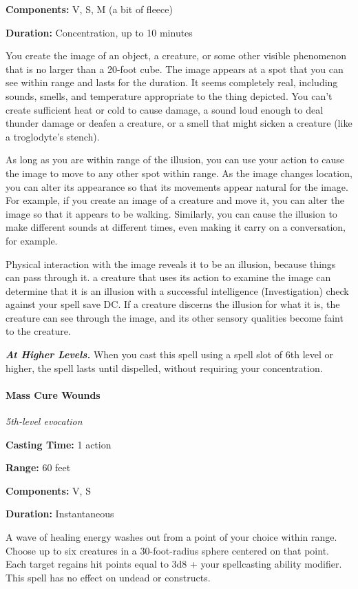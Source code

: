 \documentclass[
]{article}
\begin{document}
\textbf{Components:} V, S, M (a bit of fleece)

\textbf{Duration:} Concentration, up to 10 minutes

You create the image of an object, a creature, or some other visible
phenomenon that is no larger than a 20-foot cube. The image appears at a
spot that you can see within range and lasts for the duration. It seems
completely real, including sounds, smells, and temperature appropriate
to the thing depicted. You can't create sufficient heat or cold to cause
damage, a sound loud enough to deal thunder damage or deafen a creature,
or a smell that might sicken a creature (like a troglodyte's stench).

As long as you are within range of the illusion, you can use your action
to cause the image to move to any other spot within range. As the image
changes location, you can alter its appearance so that its movements
appear natural for the image. For example, if you create an image of a
creature and move it, you can alter the image so that it appears to be
walking. Similarly, you can cause the illusion to make different sounds
at different times, even making it carry on a conversation, for example.

Physical interaction with the image reveals it to be an illusion,
because things can pass through it. a creature that uses its action to
examine the image can determine that it is an illusion with a successful
intelligence (Investigation) check against your spell save DC. If a
creature discerns the illusion for what it is, the creature can see
through the image, and its other sensory qualities become faint to the
creature.

\emph{\textbf{At Higher Levels.}} When you cast this spell using a spell
slot of 6th level or higher, the spell lasts until dispelled, without
requiring your concentration.

\hypertarget{mass-cure-wounds}{%
\paragraph{Mass Cure Wounds}\label{mass-cure-wounds}}

\emph{5th-level evocation}

\textbf{Casting Time:} 1 action

\textbf{Range:} 60 feet

\textbf{Components:} V, S

\textbf{Duration:} Instantaneous

A wave of healing energy washes out from a point of your choice within
range. Choose up to six creatures in a 30-foot-radius sphere centered on
that point. Each target regains hit points equal to 3d8 + your
spellcasting ability modifier. This spell has no effect on undead or
constructs.
\end{document}
